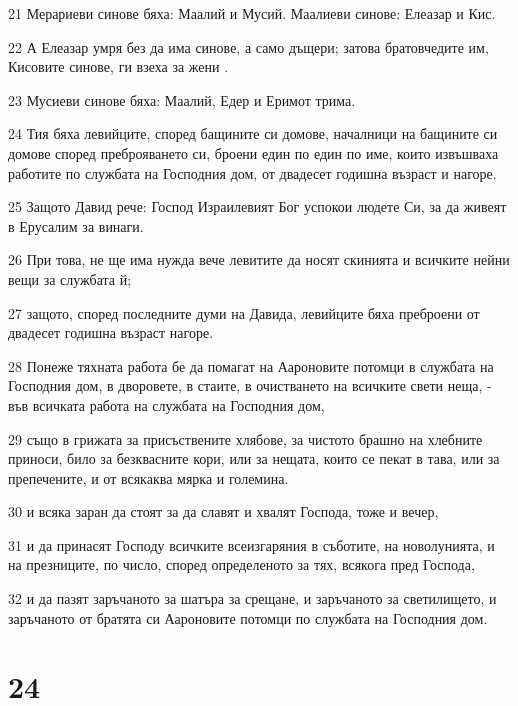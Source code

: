 \par 21 Мерариеви синове бяха: Маалий и Мусий. Маалиеви синове: Елеазар и Кис.
\par 22 А Елеазар умря без да има синове, а само дъщери; затова братовчедите им, Кисовите синове, ги взеха за жени .
\par 23 Мусиеви синове бяха: Маалий, Едер и Еримот трима.
\par 24 Тия бяха левийците, според бащините си домове, началници на бащините си домове според преброяването си, броени един по един по име, които извъшваха работите по службата на Господния дом, от двадесет годишна възраст и нагоре.
\par 25 Защото Давид рече: Господ Израилевият Бог успокои людете Си, за да живеят в Ерусалим за винаги.
\par 26 При това, не ще има нужда вече левитите да носят скинията и всичките нейни вещи за службата й;
\par 27 защото, според последните думи на Давида, левийците бяха преброени от двадесет годишна възраст нагоре.
\par 28 Понеже тяхната работа бе да помагат на Аароновите потомци в службата на Господния дом, в дворовете, в стаите, в очистването на всичките свети неща, - във всичката работа на службата на Господния дом,
\par 29 също в грижата за присъствените хлябове, за чистото брашно на хлебните приноси, било за безквасните кори, или за нещата, които се пекат в тава, или за препечените, и от всякаква мярка и големина.
\par 30 и всяка заран да стоят за да славят и хвалят Господа, тоже и вечер,
\par 31 и да принасят Господу всичките всеизгаряния в съботите, на новолунията, и на презниците, по число, според определеното за тях, всякога пред Господа,
\par 32 и да пазят заръчаното за шатъра за срещане, и заръчаното за светилището, и заръчаното от братята си Аароновите потомци по службата на Господния дом.

\chapter{24}

